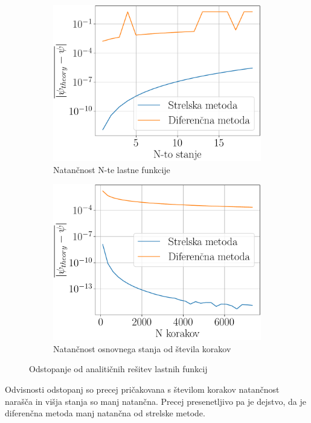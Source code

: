 \documentclass{article}
\begin{document}
\begin{figure}[H]
    \centering
    \begin{subfigure}[b]{0.49\textwidth}
        \centering
        \includegraphics[width=\textwidth]{errstates.pdf}
		\caption{Natančnost N-te lastne funkcije}
    \end{subfigure}
    \hfill
    \begin{subfigure}[b]{0.49\textwidth}
        \centering
		\includegraphics[width=\textwidth]{errstep.pdf}
        \caption{Natančnost osnovnega stanja od števila korakov}
    \end{subfigure}
    \caption{Odstopanje od analitičnih rešitev lastnih funkcij}
\end{figure}
Odvisnosti odstopanj so precej pričakovana s številom korakov natančnost narašča in višja stanja so manj natančna. Precej presenetljivo pa je dejstvo, da je diferenčna metoda manj natančna od strelske metode.
\end{document}
